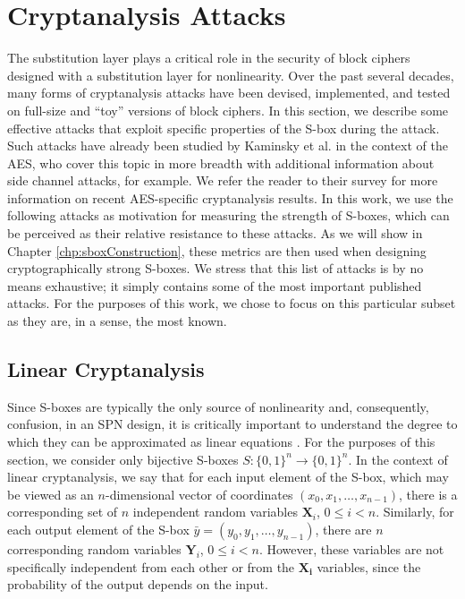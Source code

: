 \section{Cryptanalysis Attacks} \label{sec:attacks}
The substitution layer plays a critical role in the security of block ciphers designed with a substitution layer for nonlinearity. Over the past several decades, many forms of cryptanalysis attacks have been devised, implemented, and tested on full-size and ``toy'' versions of block ciphers. In this section, we describe some effective attacks that exploit specific properties of the S-box during the attack. Such attacks have already been studied by Kaminsky et al. \cite{Kaminsky10-2} in the context of the AES, who cover this topic in more breadth with additional information about side channel attacks, for example. We refer the reader to their survey for more information on recent AES-specific cryptanalysis results. In this work, we use the following attacks as motivation for measuring the strength of S-boxes, which can be perceived as their relative resistance to these attacks. As we will show in Chapter \ref{chp:sboxConstruction}, these metrics are then used when designing cryptographically strong S-boxes. We stress that this list of attacks is by no means exhaustive; it simply contains some of the most important published attacks. For the purposes of this work, we chose to focus on this particular subset as they are, in a sense, the most known.

\subsection{Linear Cryptanalysis}
Since S-boxes are typically the only source of nonlinearity and, consequently, confusion, in an SPN design, it is critically important to understand the degree to which they can be approximated as linear equations \cite{stinson-crypto}. For the purposes of this section, we consider only bijective S-boxes $S : \{0,1\}^n \to \{0,1\}^n$. In the context of linear cryptanalysis, we say that for each input element of the S-box, which may be viewed as an $n$-dimensional vector of coordinates $(x_0, x_1,\dots,x_{n-1})$, there is a corresponding set of $n$ independent random variables $\mathbf{X}_i$, $0 \leq i < n$. Similarly, for each output element of the S-box $\bar{y} = (y_0, y_1,\dots,y_{n-1})$, there are $n$ corresponding random variables $\mathbf{Y}_i$, $0 \leq i < n$. However, these variables are not specifically independent from each other or from the $\mathbf{X_i}$ variables, since the probability of the output depends on the input.

